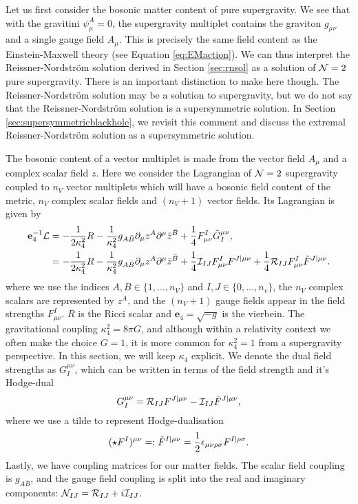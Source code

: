 Let us first consider the bosonic matter content of pure supergravity. We see that with the gravitini $\psi^A_\mu = 0$, the supergravity multiplet contains the graviton $g_{\mu \nu}$ and a single gauge field $A_\mu$. This is  precisely the same field content as the Einstein-Maxwell theory (see Equation \ref{eq:EMaction}). We can thus interpret the Reissner-Nordstr\"om solution derived in Section \ref{sec:rnsol} as a solution of ${\cal N} = 2$ pure supergravity. There is an important distinction to make here though. The Reissner-Nordstr\"om solution may be a solution to supergravity, but we do not say that the Reissner-Nordstr\"om solution is a supersymmetric solution. In Section \ref{sec:supersymmetricblackhole}, we revisit this comment and discuss the extremal Reissner-Nordstr\"om solution as a supersymmetric solution.

The bosonic content of a vector multiplet is made from the vector field $A_\mu$ and a complex scalar field $z$. Here we consider the Lagrangian of ${\cal N} = 2$ supergravity coupled to $n_V$ vector multiplets which will have a bosonic field content of the metric, $n_V$ complex scalar fields and $(n_V + 1)$ vector fields. Its Lagrangian is given by \cite{Cremmer:1984hj, Cortes:2009cs}
\begin{equation}
\begin{aligned}
\label{eq:vecmullag}
	 \mathbf{e}_4^{-1} {\cal L} &= -\frac{1}{2\kappa_4^2}R - \frac{1}{\kappa^2_4} g_{A\bar{B}} \partial_\mu z^A \partial^\mu \bar{z}^{\bar{B}} + \frac{1}{4} F^I_{\mu \nu} \tilde{G}^{\mu \nu}_{I}, \\
	 &=- \frac{1}{2\kappa_4^2}R - \frac{1}{\kappa_4^2}g_{A\bar{B}} \partial_\mu z^A \partial^\mu \bar{z}^{\bar{B}} + \frac{1}{4} {\cal I}_{IJ} F^I_{\mu \nu} F^{J|\mu \nu} + \frac{1}{4} {\cal R}_{IJ} F^I_{\mu \nu} \tilde{F}^{J|\mu \nu}.
\end{aligned}
\end{equation}
where we use the indices $A,B \in \{1,\ldots,n_V\}$ and $I,J \in \{0,\ldots,n_v\}$, the $n_V$ complex scalars are represented by $z^A$, and the $(n_V + 1)$ gauge fields appear in the field strengths $F^I_{\mu \nu}$. $R$ is the Ricci scalar and $\mathbf{e}_4 = \sqrt{-g}$ is the vierbein. The gravitational coupling $\kappa_4^2 = 8\pi G$, and although within a relativity context we often make the choice $G = 1$, it is more common for $\kappa_4^2 = 1$ from a supergravity perspective. In this section, we will keep $\kappa_4$ explicit. We denote the dual field strengths as $G_{I}^{\mu \nu}$, which can be written in terms of the field strength and it's Hodge-dual 
\begin{equation*}
	G_{I}^{\mu \nu} = {\cal R}_{IJ} F^{J | \mu \nu} - {\cal I}_{IJ} \tilde{F}^{J | \mu \nu}, 
\end{equation*}
where we use a tilde to represent Hodge-dualisation
\begin{equation*}
	(\star F^I)^{\mu \nu} =: \tilde{F}^{I | \mu \nu} = \frac{1}{2} \epsilon_{\mu \nu \rho \sigma} F^{I | \rho \sigma}.
\end{equation*}
Lastly, we have coupling matrices for our matter fields. The scalar field coupling is $g_{A\bar{B}}$, and the gauge field coupling is split into the real and imaginary components: ${\cal N}_{IJ} = {\cal R}_{IJ} + i {\cal I}_{IJ}$.

